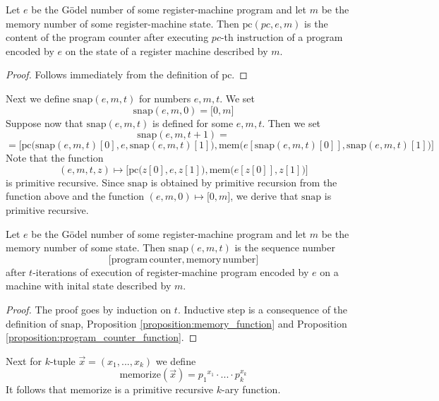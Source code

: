 \documentclass[10pt]{amsart}
\begin{document}
\begin{proposition}\label{proposition:program_counter_function}
	Let $e$ be the G{\"o}del number of some register-machine program and let $m$ be the memory number of some register-machine state. Then $\mathrm{pc}(pc,e,m)$ is the content of the program counter after executing $pc$-th instruction of a program encoded by $e$ on the state of a register machine described by $m$.
\end{proposition}
\begin{proof}
	Follows immediately from the definition of $\mathrm{pc}$.
\end{proof}
\noindent
Next we define $\mathrm{snap}(e,m,t)$ for numbers $e,m,t$. We set
$$\mathrm{snap}(e,m,0) = \pmb{[}0,m\pmb{]}$$
Suppose now that $\mathrm{snap}(e,m,t)$ is defined for some $e,m,t$. Then we set
$$\mathrm{snap}(e,m,t + 1) = $$
$$=\pmb{\big[}\mathrm{pc}\big(\mathrm{snap}(e,m,t)[0],e,\mathrm{snap}(e,m,t)[1]\big),\mathrm{mem}\big(e[\mathrm{snap}(e,m,t)[0]],\mathrm{snap}(e,m,t)[1]\big)\pmb{\big]}$$
Note that the function
$$(e,m,t,z) \mapsto \pmb{\big[}\mathrm{pc}\big(z[0],e,z[1]\big),\mathrm{mem}\big(e[z[0]],z[1]\big)\pmb{\big]}$$
is primitive recursive. Since $\mathrm{snap}$ is obtained by primitive recursion from the function above and the function $(e,m,0)\mapsto \pmb{[}0,m\pmb{]}$, we derive that $\mathrm{snap}$ is primitive recursive.

\begin{proposition}\label{proposition:snapshot_of_machine_function}
	Let $e$ be the G{\"o}del number of some register-machine program and let $m$ be the memory number of some state. Then $\mathrm{snap}(e,m,t)$ is the sequence number
	$$\pmb{[}\mathrm{program\,counter},\mathrm{memory\,number}\pmb{]}$$
	after $t$-iterations of execution of register-machine program encoded by $e$ on a machine with inital state described by $m$.
\end{proposition}
\begin{proof}
	The proof goes by induction on $t$. Inductive step is a consequence of the definition of $\mathrm{snap}$, Proposition \ref{proposition:memory_function} and Proposition \ref{proposition:program_counter_function}.
\end{proof}
\noindent
Next for $k$-tuple $\vec{x} = (x_1,...,x_k)$ we define
$$\mathrm{memorize}(\vec{x}) = {p_1}^{x_1}\cdot ...\cdot p_k^{x_k}$$
It follows that $\mathrm{memorize}$ is a primitive recursive $k$-ary function.
\end{document}
